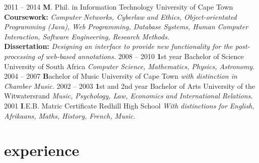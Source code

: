 \documentclass[]{friggeri-cv} %
\begin{document}
\begin{entrylist}
\entry
{2011 -- 2014}
{\textbf M. Phil. in Information Technology}
{University of Cape Town}
{\textbf{Coursework:} \emph{Computer Networks, Cyberlaw and Ethics, Object-orientated Programming (Java), Web Programming, Database Systems, Human Computer Interaction, Software Engineering, Research Methods.}\\
\textbf{Dissertation:} \emph{Designing an interface to provide new
functionality for the post-processing of
web-based annotations.}}
\entry
{2008 -- 2010}
{\textbf 1st year Bachelor of Science}
{University of South Africa}
{\emph{Computer Science, Mathematics, Physics, Astronomy.}}
\entry
{2004 -- 2007}
{\textbf Bachelor of Music}
{University of Cape Town}
{\emph{with distinction in Chamber Music.}}
\entry
{2002 -- 2003}
{\textbf 1st and 2nd year Bachelor of Arts}
{University of the Witwatersrand}
{\emph{Music, Psychology, Law, Economics and International Relations.}}
\entry
{2001}
{\textbf I.E.B. Matric Certificate }
{Redhill High School}
{\emph{With distinctions for English, Afrikaans, Maths, History, French, Music.}}

\end{entrylist}


\section{experience}
\end{document}
